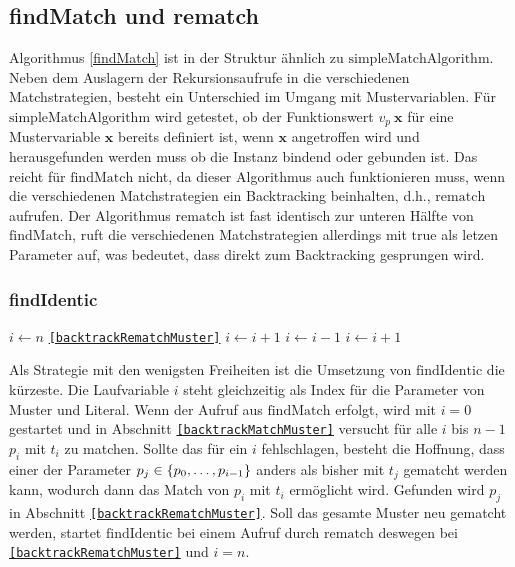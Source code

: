 \subsection{findMatch und rematch}
Algorithmus \ref{findMatch} ist in der Struktur ähnlich zu $\mathrm{simpleMatchAlgorithm}$. Neben dem Auslagern der Rekursionsaufrufe in die verschiedenen Matchstrategien, besteht ein Unterschied im Umgang mit Mustervariablen. Für $\mathrm{simpleMatchAlgorithm}$ wird getestet, ob der Funktionswert $v_p~\mathbf x$ für eine Mustervariable $\mathbf x$ bereits definiert ist, wenn $\mathbf x$ angetroffen wird und herausgefunden werden muss ob die Instanz bindend oder gebunden ist. Das reicht für $\mathrm{findMatch}$ nicht, da dieser Algorithmus auch funktionieren muss, wenn die verschiedenen Matchstrategien ein Backtracking beinhalten, d.h., $\mathrm{rematch}$ aufrufen.
Der Algorithmus $\mathrm{rematch}$ ist fast identisch zur unteren Hälfte von $\mathrm{findMatch}$, ruft die verschiedenen Matchstrategien allerdings mit $\mathrm{true}$ als letzen Parameter auf, was bedeutet, dass direkt zum Backtracking gesprungen wird.



\subsubsection {findIdentic}
\begin{algorithm}
\DontPrintSemicolon
\caption{$\mathrm{findIdentic} \colon M \times T \times \mathit{Bool} \rightarrow \mathit{Bool}$}\label{findIdentic}
\;
 {
	$i \leftarrow n$\;
	\Goto \texttt{\ref{backtrackRematchMuster}}\;
}
\Loop {} {
	 \label{backtrackMatchMuster}
	 {
		$i \leftarrow i + 1$\;
		 {}    
	}
	 \label{backtrackRematchMuster}
	 { 
		 {}
		$i \leftarrow i - 1$\;
	}    
	$i \leftarrow i + 1$\;
}
\end{algorithm}


Als Strategie mit den wenigsten Freiheiten ist die Umsetzung von $\mathrm{findIdentic}$ die kürzeste. Die Laufvariable $i$ steht gleichzeitig als Index für die Parameter von Muster und Literal. Wenn der Aufruf aus $\mathrm{findMatch}$ erfolgt, wird mit $i = 0$ gestartet und in Abschnitt \texttt{\ref{backtrackMatchMuster}} versucht für alle $i$ bis $n-1$ $p_i$ mit $t_i$ zu matchen. Sollte das  für ein $i$ fehlschlagen, besteht die Hoffnung, dass einer der Parameter $p_j \in \{{p}_{0}, \dots, {p}_{i-1}\}$ anders als bisher mit $t_j$ gematcht werden kann, wodurch dann das Match von $p_i$ mit $t_i$ ermöglicht wird. Gefunden wird $p_j$ in Abschnitt \texttt{\ref{backtrackRematchMuster}}. 
Soll das gesamte Muster neu gematcht werden, startet $\mathrm{findIdentic}$ bei einem Aufruf durch $\mathrm{rematch}$ deswegen bei \texttt{\ref{backtrackRematchMuster}} und $i = n$.

